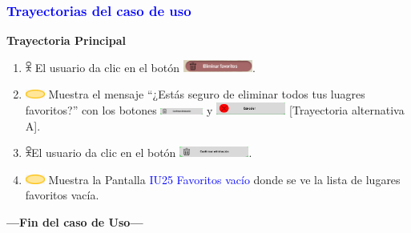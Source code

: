 \subsubsection{\textcolor{blue}{Trayectorias del caso de uso}}

\textbf{Trayectoria Principal}
\begin{enumerate}
    \item \includegraphics[width=0.0150\textwidth]{Figuras/persona.png} El usuario da clic en el botón \includegraphics[width=0.180\textwidth]{ComponentesCU/Eliminar favoritos.png}.
    \item \includegraphics[width=0.0500\textwidth]{Figuras/sistema.png} Muestra el mensaje “¿Estás seguro de eliminar todos tus luagres favoritos?” con los botones \includegraphics[width=0.110\textwidth]{ComponentesCU/img2.png}  y \includegraphics[width=0.180\textwidth]{ComponentesCU/img3.png} [Trayectoria alternativa A].
    \item \includegraphics[width=0.0150\textwidth]{Figuras/persona.png}El usuario da clic en el botón \includegraphics[width=0.180\textwidth]{ComponentesCU/img2.png}.
    \item \includegraphics[width=0.0500\textwidth]{Figuras/sistema.png} Muestra la Pantalla \textcolor{blue}{IU25 Favoritos vacío} donde se ve la lista de lugares favoritos vacía.
\end{enumerate}
\textbf{---Fin del caso de Uso---}
\vspace{15pt}

